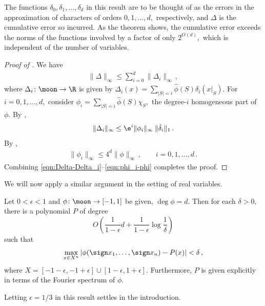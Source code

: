 The functions $\delta_0,\delta_1,\dots,\delta_d$ in
this result are to be thought of as the errors in the approximation of 
characters of orders $0,1,\dots,d,$ respectively, and
$\Delta$ is the cumulative error so incurred.
As the theorem shows, the
cumulative error exceeds the norms of the functions
involved by a factor of only $2^{O(d)},$ which is
independent of the number of variables.

\begin{proof}
[Proof of ]
We have 
\begin{align}
\|\Delta\|_\infty \leq
\sum_{i=0}^d\|\Delta_i\|_\infty\,,
\label{eqn:Delta-Delta_i}
\end{align}
where $\Delta_i\colon\moon\to\R$ is given by
$\Delta_i(x) = \sum_{|S|=i}\hat\phi(S)\delta_i(x|_S)$.
For $i=0,1,\dots,d,$ consider 
$\phi_i=\sum_{|S|=i}\hat\phi(S)\chi_S,$ the
degree-$i$ homogeneous part of $\phi$.
By ,
\begin{align}
\|\Delta_i\|_\infty \leq \e^i \|\phi_i\|_\infty\:
\|\hat\delta_i\|_1\,.
\end{align}
By ,
\begin{align}
\|\phi_i\|_\infty \leq 4^d \|\phi\|_\infty\,, \qquad
i=0,1,\dots,d\,.
\label{eqn:phi_i-phi}
\end{align}
Combining
\eqref{eqn:Delta-Delta_i}--\eqref{eqn:phi_i-phi}
completes the proof.
\end{proof}


We will now apply a similar argument in the setting of
real variables. 

%
\begin{theorem}
Let $0<\epsilon<1$ and $\phi\colon\moon\to[-1,1]$ be given,
$\deg\phi=d$. 
Then for each $\delta>0,$ there is a
polynomial $P$ of degree
\[
O\left(\frac1{1-\epsilon}
d+\frac1{1-\epsilon} \log \frac1\delta\right)
\]
such that 
\begin{align}
   \max_{x\in X^n}\left|\phi(\sign x_1,\dots,\sign
   x_n)-P(x)\right| <\delta\,,
   \label{eqn:P-main-technical}
\end{align}
where $X=[-1-\epsilon,-1+\epsilon]\cup
         [1-\epsilon,1+\epsilon]$.
Furthermore, $P$ is given explicitly in terms of the
Fourier spectrum of $\phi$. 
\end{theorem}
%

Letting $\epsilon=1/3$ in this result settles  in the introduction. 

